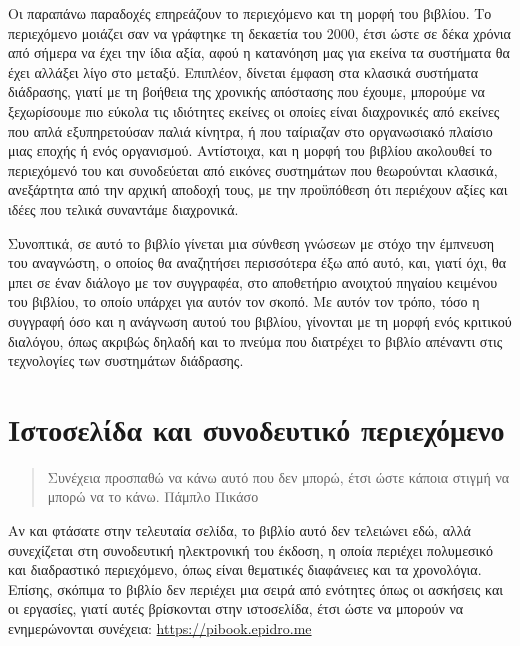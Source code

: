 \documentclass[
]{article}
\begin{document}
Οι παραπάνω παραδοχές επηρεάζουν το περιεχόμενο και τη μορφή του
βιβλίου. Το περιεχόμενο μοιάζει σαν να γράφτηκε τη δεκαετία του 2000,
έτσι ώστε σε δέκα χρόνια από σήμερα να έχει την ίδια αξία, αφού η
κατανόηση μας για εκείνα τα συστήματα θα έχει αλλάξει λίγο στο μεταξύ.
Επιπλέον, δίνεται έμφαση στα κλασικά συστήματα διάδρασης, γιατί με τη
βοήθεια της χρονικής απόστασης που έχουμε, μπορούμε να ξεχωρίσουμε πιο
εύκολα τις ιδιότητες εκείνες οι οποίες είναι διαχρονικές από εκείνες που
απλά εξυπηρετούσαν παλιά κίνητρα, ή που ταίριαζαν στο οργανωσιακό
πλαίσιο μιας εποχής ή ενός οργανισμού. Αντίστοιχα, και η μορφή του
βιβλίου ακολουθεί το περιεχόμενό του και συνοδεύεται από εικόνες
συστημάτων που θεωρούνται κλασικά, ανεξάρτητα από την αρχική αποδοχή
τους, με την προϋπόθεση ότι περιέχουν αξίες και ιδέες που τελικά
συναντάμε διαχρονικά.

Συνοπτικά, σε αυτό το βιβλίο γίνεται μια σύνθεση γνώσεων με στόχο την
έμπνευση του αναγνώστη, ο οποίος θα αναζητήσει περισσότερα έξω από αυτό,
και, γιατί όχι, θα μπει σε έναν διάλογο με τον συγγραφέα, στο αποθετήριο
ανοιχτού πηγαίου κειμένου του βιβλίου, το οποίο υπάρχει για αυτόν τον
σκοπό. Με αυτόν τον τρόπο, τόσο η συγγραφή όσο και η ανάγνωση αυτού του
βιβλίου, γίνονται με τη μορφή ενός κριτικού διαλόγου, όπως ακριβώς
δηλαδή και το πνεύμα που διατρέχει το βιβλίο απέναντι στις τεχνολογίες
των συστημάτων διάδρασης.

\hypertarget{ux3b9ux3c3ux3c4ux3bfux3c3ux3b5ux3bbux3afux3b4ux3b1-ux3baux3b1ux3b9-ux3c3ux3c5ux3bdux3bfux3b4ux3b5ux3c5ux3c4ux3b9ux3baux3cc-ux3c0ux3b5ux3c1ux3b9ux3b5ux3c7ux3ccux3bcux3b5ux3bdux3bf}{%
\section{Ιστοσελίδα και συνοδευτικό
περιεχόμενο}\label{ux3b9ux3c3ux3c4ux3bfux3c3ux3b5ux3bbux3afux3b4ux3b1-ux3baux3b1ux3b9-ux3c3ux3c5ux3bdux3bfux3b4ux3b5ux3c5ux3c4ux3b9ux3baux3cc-ux3c0ux3b5ux3c1ux3b9ux3b5ux3c7ux3ccux3bcux3b5ux3bdux3bf}}

\begin{quote}
Συνέχεια προσπαθώ να κάνω αυτό που δεν μπορώ, έτσι ώστε κάποια στιγμή να
μπορώ να το κάνω. Πάμπλο Πικάσο
\end{quote}

Αν και φτάσατε στην τελευταία σελίδα, το βιβλίο αυτό δεν τελειώνει εδώ,
αλλά συνεχίζεται στη συνοδευτική ηλεκτρονική του έκδοση, η οποία
περιέχει πολυμεσικό και διαδραστικό περιεχόμενο, όπως είναι θεματικές
διαφάνειες και τα χρονολόγια. Επίσης, σκόπιμα το βιβλίο δεν περιέχει μια
σειρά από ενότητες όπως οι ασκήσεις και οι εργασίες, γιατί αυτές
βρίσκονται στην ιστοσελίδα, έτσι ώστε να μπορούν να ενημερώνονται
συνέχεια: \url{https://pibook.epidro.me}
\end{document}
